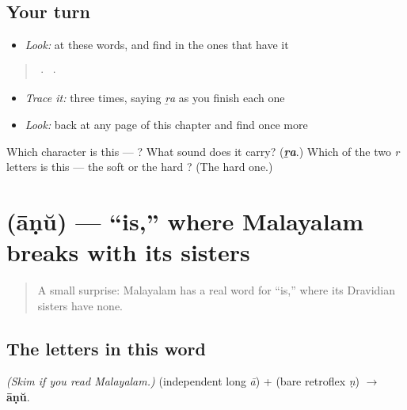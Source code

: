 \subsection*{Your turn}
\begin{itemize}
\raggedright
  \item \emph{Look:} at these words, and find  in the ones that have it
\end{itemize}

\begin{quote}
  ·    ·  
\end{quote}

\begin{itemize}
\raggedright
  \item \emph{Trace it:}  three times, saying \emph{ṟa} as you finish each one
  \item \emph{Look:} back at any page of this chapter and find  once more
\end{itemize}

\begin{tcolorbox}[breakable,colback=teal!4,colframe=teal!35!black,title={Before you move on}]
Which character is this — ? What sound does it carry? (\emph{\textbf{ṟa}}.) Which of the two \emph{r} letters is this — the soft  or the hard ? (The hard one.)
\end{tcolorbox}
\section[\texorpdfstring{\ml{ആണ്} (āṇŭ)}{ആണ് (āṇŭ)}]{ (āṇŭ) — \textquotedblleft{}is,\textquotedblright{} where Malayalam breaks with its sisters}

\label{lesson:ML-C02-aanu}



\begin{quote}
A small surprise: Malayalam has a real word for \textquotedblleft{}is,\textquotedblright{} where its Dravidian sisters have none.
\end{quote}

\subsection*{The letters in this word}
\emph{(Skim if you read Malayalam.)} \textbf{} (independent long \emph{ā}) + \textbf{} (bare retroflex \emph{ṇ}) $\to$ \textbf{āṇŭ}.

